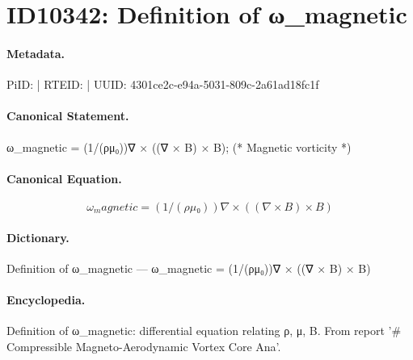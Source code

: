 \section*{ID10342: Definition of ω\_magnetic}
\paragraph{Metadata.}
PiID:  | RTEID:  | UUID: 4301ce2c-e94a-5031-809c-2a61ad18fc1f

\paragraph{Canonical Statement.}
ω\_magnetic = (1/(ρμ₀))∇ × ((∇ × B) × B); (* Magnetic vorticity *)

\paragraph{Canonical Equation.}
\[
ω_magnetic = (1/(ρμ₀))∇ × ((∇ × B) × B)
\]

\paragraph{Dictionary.}
Definition of ω\_magnetic — ω\_magnetic = (1/(ρμ₀))∇ × ((∇ × B) × B)

\paragraph{Encyclopedia.}
Definition of ω\_magnetic: differential equation relating ρ, μ, B. From report '\# Compressible Magneto-Aerodynamic Vortex Core Ana'.
